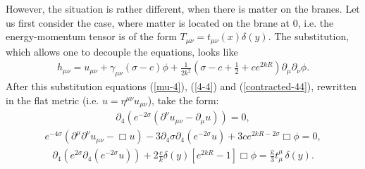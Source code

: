 \documentclass[a4paper,12pt]{article}
\begin{document}
However, the situation is rather different, when there is matter on the
branes. Let us first  consider the case, where matter is located on the
brane at $0$, i.e. the energy-momentum tensor is of the form $T_{\mu\nu} =
 t_{\mu\nu}(x)\delta(y)$. The substitution, which allows one to decouple
the equations, looks like
\begin{eqnarray}\label{substitution1}
h_{\mu\nu} =  u_{\mu\nu} + \gamma_{\mu\nu}(\sigma - c)\phi +
 \frac{1}{2k^2} \left(\sigma - c +\frac{1}{2} +
{c}e^{2kR}\right) \partial_\mu \partial_\nu \phi.
\end{eqnarray}
After this substitution equations (\ref{mu-4}), (\ref{4-4}) and
(\ref{contracted-44}), rewritten in the flat metric (i.e. $u=
\eta^{\mu\nu}u_{\mu\nu}$), take the form:
\begin{eqnarray}\label{mu4TT}
\partial_4(e^{-2\sigma}(\partial^\nu u_{\mu\nu}-\partial_\mu
u))=0,
\end{eqnarray}
\begin{eqnarray}\label{44TT}
e^{-4\sigma}(\partial^\mu\partial^\nu u_{\mu\nu}-\Box u) -
3\partial_4\sigma\partial_4(e^{-2\sigma}u)+3ce^{2kR-2\sigma}\Box
\phi=0,
\end{eqnarray}
\begin{eqnarray}\label{contTT}
\partial_4(e^{2\sigma}\partial_4(e^{-2\sigma}u))+2\frac{c}{k}\delta(y)\left[e^{2kR}
-1\right]\Box \phi=\frac{\hat\kappa}{3}t_\mu^\mu \, \delta(y).
\end{eqnarray}
\end{document}
